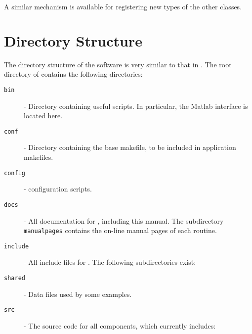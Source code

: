 	A similar mechanism is available for registering new types of the other classes.

\section{Directory Structure}

	The directory structure of the \slepc software is very similar to that in \petsc. The root directory of \slepc contains the following directories:
\begin{description}
\item[\texttt{bin}] - Directory containing useful scripts. In particular, the Matlab interface is located here.
\item[\texttt{conf}] - Directory containing the base \slepc makefile, to be included in application makefiles.
\item[\texttt{config}] - \slepc configuration scripts. 
\item[\texttt{docs}] - All documentation for \slepc, including this manual. The subdirectory \texttt{manualpages} contains the on-line manual pages of each \slepc routine.
\item[\texttt{include}] - All include files for \slepc. The following subdirectories exist:
\item[\texttt{shared}] - Data files used by some examples.
\item[\texttt{src}] - The source code for all \slepc components, which currently includes:
\end{description}
